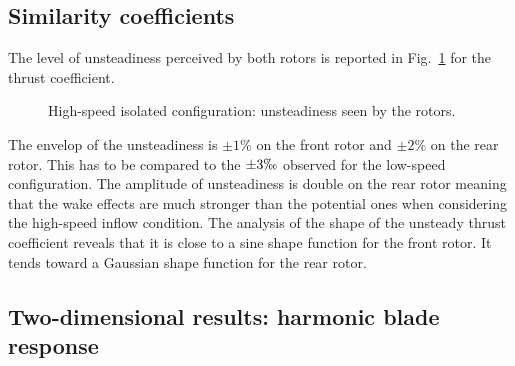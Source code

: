 
\subsection{Similarity coefficients}
\label{sub:dream_hs_hb_sim_coeff}


The level of unsteadiness perceived by both rotors is reported
in Fig.~\ref{fig:dream_hs_hb_unst_coeff} for the thrust coefficient.
\begin{figure}[htp]
  \centering
  \caption{High-speed isolated configuration: unsteadiness seen by the rotors.}
  \label{fig:dream_hs_hb_unst_coeff}
\end{figure}
The envelop of the unsteadiness is $\pm 1\%$ on the front rotor
and $\pm 2\%$ on the rear rotor. This has to be compared to 
the $\pm 3 \permil$ observed for the low-speed configuration.
The amplitude of unsteadiness is double on the rear rotor
meaning that the wake effects are much stronger than the
potential ones when considering the high-speed inflow condition.
The analysis of the shape of the unsteady thrust coefficient
reveals that it is close to a sine shape function for the front
rotor. It tends toward a Gaussian shape function for the rear rotor.

\subsection{Two-dimensional results: harmonic blade response}
\label{sub:dream_hs_hb_blade_response}

